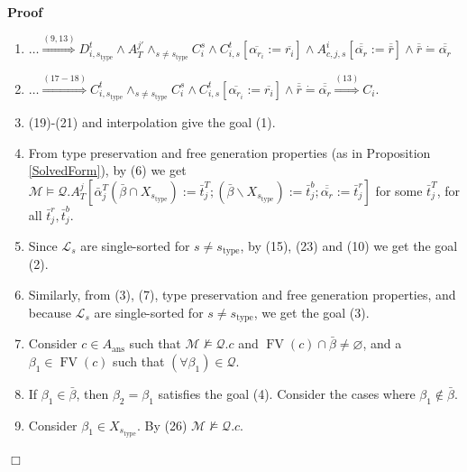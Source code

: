 \documentclass{article}
\newcommand{\assign}{:=}
\newcommand{\nin}{\not\in}
\newcommand{\tmop}[1]{\ensuremath{\operatorname{#1}}}
\newenvironment{proof}{\noindent\textbf{Proof\ }}{\hspace*{\fill}$\Box$\medskip}
\begin{document}
\begin{proof}
\begin{enumerate}
    \item $\ldots \overset{(9, 13)}{\Longrightarrow} D_{i, s_{\tmop{type}}}^t
    \wedge A_T^{j\prime} \wedge_{s \neq s_{\tmop{type}}} C_i^s \wedge C_{i,
    s}^t [\overline{\alpha_{r_i}} \assign \overline{r_i}] \wedge A_{c, j, s}^i
    [\overline{\overline{\alpha_r}} \assign \overline{\bar{r}}] \wedge
    \overline{\bar{r}} \dot{=} \overline{\overline{\alpha_r}}$
    
    \item $\ldots \overset{(17 - 18)}{\Longrightarrow} C_{i,
    s_{\tmop{type}}}^t \wedge_{s \neq s_{\tmop{type}}} C_i^s \wedge C_{i, s}^t
    [\overline{\alpha_{r_i}} \assign \overline{r_i}] \wedge \overline{\bar{r}}
    \dot{=} \overline{\overline{\alpha_r}} \overset{(13)}{\Longrightarrow}
    C_i$.
    
    \item (19)-(21) and interpolation give the goal (1).
    
    \item From type preservation and free generation properties (as in
    Proposition \ref{SolvedForm}), by (6) we get $\mathcal{M} \vDash
    \mathcal{Q}.A_T^j \left[ \bar{\alpha}_j^T (\bar{\beta} \cap
    X_{s_{\tmop{type}}}) \assign \bar{t}_j^T ; (\bar{\beta} \backslash
    X_{s_{\tmop{type}}}) \assign \bar{t}_j^b ; \overline{\overline{\alpha_r}}
    \assign \bar{t}_j^r \right]$ for some $\bar{t}_j^T$, for all $\bar{t}_j^r,
    \bar{t}_j^b$.
    
    \item Since $\mathcal{L}_s$ are single-sorted for $s \neq
    s_{\tmop{type}}$, by (15), (23) and (10) we get the goal (2).
    
    \item Similarly, from (3), (7), type preservation and free generation
    properties, and because $\mathcal{L}_s$ are single-sorted for $s \neq
    s_{\tmop{type}}$, we get the goal (3).
    
    \item Consider $c \in A_{\tmop{ans}}$ such that $\mathcal{M} \nvDash
    \mathcal{Q}.c$ and $\tmop{FV} (c) \cap \bar{\beta} \neq \varnothing$, and
    a $\beta_1 \in \tmop{FV} (c)$ such that $(\forall \beta_1) \in
    \mathcal{Q}$.
    
    \item If $\beta_1 \in \bar{\beta}$, then $\beta_2 = \beta_1$ satisfies the
    goal (4). Consider the cases where $\beta_1 \nin \bar{\beta}$.
    
    \item Consider $\beta_1 \in X_{s_{\tmop{type}}}$. By (26) $\mathcal{M}
    \nvDash \mathcal{Q}.c$.
    

\end{enumerate}
\end{proof}
\end{document}
